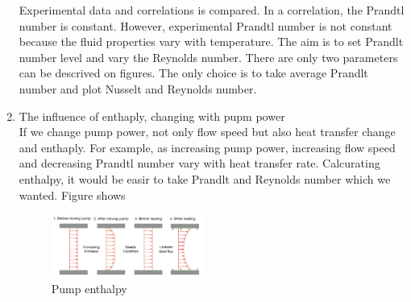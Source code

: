 \documentclass[conference]{IEEEtran}
\begin{document}
\begin{enumerate}
  Experimental data and correlations is compared.
  In a correlation, the Prandtl number is constant.
  However, experimental Prandtl number is not constant because the fluid properties vary with temperature.
  The aim is to set Prandlt number level and vary the Reynolds number.
  There are only two parameters can be descrived on figures.
  The only choice is to take average Prandlt number and plot Nusselt and Reynolds number.
  \item The influence of enthaply, changing with pupm power\\
  If we change pump power, not only flow speed but also heat transfer change and enthaply.
  For example, as increasing pump power, increasing flow speed and decreasing Prandtl number vary with heat transfer rate.
  Calcurating enthalpy, it would be easir to take Prandlt and Reynolds number which we wanted.
  Figure\label{experimental_loop} shows 
\begin{figure}[htbp]
  \centering
  \includegraphics[width=0.47\textwidth,natwidth=750,natheight=300]{fig/pump_enthalpy.png}
  \caption{Pump enthalpy}
  \label{pump_enthalpy}
  \vspace{0zh}
\end{figure}
  

\end{enumerate}
\end{document}
